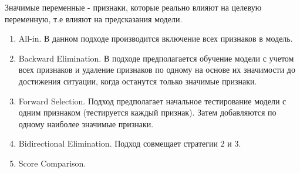 Значимые переменные - признаки, которые реально влияют на целевую переменную, т.е влияют на предсказания модели.

\begin{enumerate}
\item All-in. В данном подходе производится включение всех признаков в
модель.
\item Backward Elimination. В подходе предполагается обучение модели с
учетом всех признаков и удаление признаков по одному на основе их
значимости до достижения ситуации, когда останутся только значимые
признаки.
\item Forward Selection. Подход предполагает начальное тестирование
модели с одним признаком (тестируется каждый признак). Затем добавляются
по одному наиболее значимые признаки.
\item Bidirectional Elimination. Подход совмещает стратегии 2 и 3.
\item Score Comparison.
\end{enumerate}

\endinput